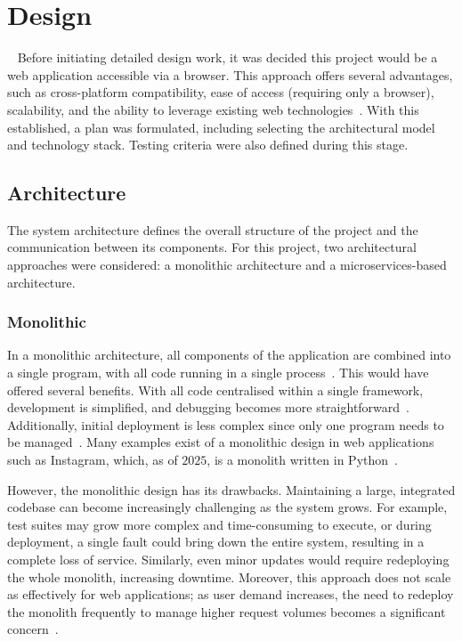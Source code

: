 \chapter{Design}~\label{cha:design}
Before initiating detailed design work, it was decided this project would be a web application accessible via a browser. This approach offers several advantages, such as cross-platform compatibility, ease of access (requiring only a browser), scalability, and the ability to leverage existing web technologies~\cite{6822300}. With this established, a plan was formulated, including selecting the architectural model and technology stack. Testing criteria were also defined during this stage.

\section{Architecture}
The system architecture defines the overall structure of the project and the communication between its components. For this project, two architectural approaches were considered: a monolithic architecture and a microservices-based architecture.

\subsection{Monolithic}
In a monolithic architecture, all components of the application are combined into a single program, with all code running in a single process~\cite{10.1145/3241403.3241440}. This would have offered several benefits. With all code centralised within a single framework, development is simplified, and debugging becomes more straightforward~\cite{sym14091824}. Additionally, initial deployment is less complex since only one program needs to be managed~\cite{9109514}. Many examples exist of a monolithic design in web applications such as Instagram, which, as of $2025$, is a monolith written in Python~\cite{InstagramMonolith}.

However, the monolithic design has its drawbacks. Maintaining a large, integrated codebase can become increasingly challenging as the system grows. For example, test suites may grow more complex and time-consuming to execute, or during deployment, a single fault could bring down the entire system, resulting in a complete loss of service. Similarly, even minor updates would require redeploying the whole monolith, increasing downtime. Moreover, this approach does not scale as effectively for web applications; as user demand increases, the need to redeploy the monolith frequently to manage higher request volumes becomes a significant concern~\cite{9109514}.


